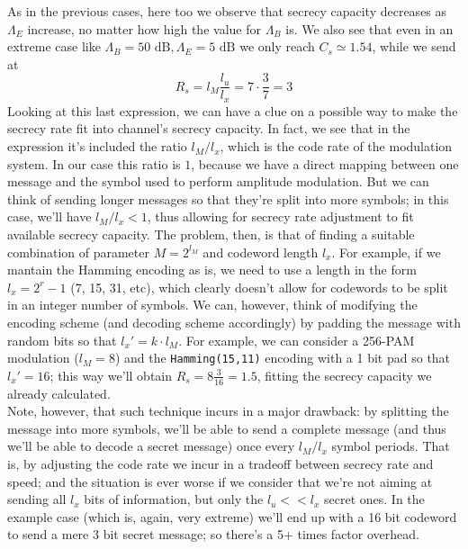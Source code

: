 \documentclass[a4paper,12pt,titlepage]{article}
\begin{document}
As in the previous cases, here too we observe that secrecy capacity decreases as
$\Lambda_E$ increase, no matter how high the value for $\Lambda_B$ is. We
also see that even in an extreme case like $\Lambda_B = 50 \text{ dB},
\Lambda_E = 5 \text{ dB}$ we only reach $C_s \simeq 1.54$, while we send at
\[
  R_s = l_M \frac{l_u}{l_x} = 7 \cdot \frac{3}{7} = 3 
\]
Looking at this last expression, we can have a clue on a possible way to make
the secrecy rate fit into channel's secrecy capacity. In fact, we see that in
the expression it's included the ratio $l_M / l_x$, which is the code rate of
the modulation system. In our case this
ratio is $1$, because we have a direct mapping between one message and the
symbol used to perform amplitude modulation. But we can think of sending
longer messages so that they're split into more symbols; in this case, we'll
have $l_M / l_x < 1$, thus allowing for secrecy rate adjustment to fit
available secrecy capacity.
The problem, then, is that of finding a suitable combination of
parameter $M = 2^{l_M}$ and codeword length $l_x$. For example, if we mantain
the Hamming encoding as is, we need to use a length in the form $l_x = 2^r -1$
(7, 15, 31, etc), which clearly doesn't allow for codewords to be split in an
integer number of symbols. We can, however, think of modifying the encoding
scheme (and decoding scheme accordingly) by padding the message with random
bits so that $l_x' = k \cdot l_M$. For example, we can consider a 256-PAM
modulation ($l_M = 8$) and the \texttt{Hamming(15,11)} encoding with a 1 bit
pad so that $l_x' = 16$; this way we'll obtain $R_s = 8 \frac{3}{16} = 1.5$,
fitting the secrecy capacity we already calculated. \\
Note, however, that such technique incurs in a major drawback: by splitting the
message into more symbols, we'll be able to send a complete message (and thus
we'll be able to decode a secret message) once every $l_M /
l_x$ symbol periods. That is, by adjusting the code rate we incur in a tradeoff
between secrecy rate and speed; and the situation is ever worse if we consider
that we're not aiming at sending all $l_x$ bits of information, but only the
$l_u << l_x$ secret ones. In the example case (which is, again, very extreme)
we'll end up with a 16 bit codeword to send a mere 3 bit secret message; so
there's a 5+ times factor overhead. \\
\end{document}
